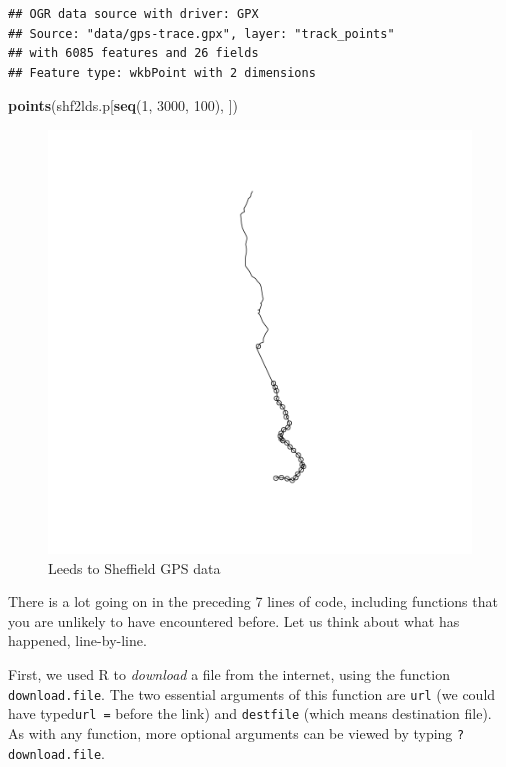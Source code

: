 \documentclass[]{article}
\makeatletter
\newenvironment{Shaded}{}{}
\newcommand{\KeywordTok}[1]{\textcolor[rgb]{0.00,0.44,0.13}{\textbf{{#1}}}}
\newcommand{\DecValTok}[1]{\textcolor[rgb]{0.25,0.63,0.44}{{#1}}}
\newcommand{\NormalTok}[1]{{#1}}
\def\maxwidth{\ifdim\Gin@nat@width>\linewidth\linewidth
\else\Gin@nat@width\fi}
\let\Oldincludegraphics\includegraphics
\renewcommand{\includegraphics}[1]{\Oldincludegraphics[width=\maxwidth]{#1}}
\makeatother
\begin{document}
\begin{verbatim}
## OGR data source with driver: GPX 
## Source: "data/gps-trace.gpx", layer: "track_points"
## with 6085 features and 26 fields
## Feature type: wkbPoint with 2 dimensions
\end{verbatim}
\begin{Shaded}
\begin{Highlighting}[]
\KeywordTok{points}\NormalTok{(shf2lds.p[}\KeywordTok{seq}\NormalTok{(}\DecValTok{1}\NormalTok{, }\DecValTok{3000}\NormalTok{, }\DecValTok{100}\NormalTok{), ])}
\end{Highlighting}
\end{Shaded}
\begin{figure}[htbp]
\centering
\includegraphics{figure/Leeds_to_Sheffield_GPS_data.png}
\caption{Leeds to Sheffield GPS data}
\end{figure}

There is a lot going on in the preceding 7 lines of code, including
functions that you are unlikely to have encountered before. Let us think
about what has happened, line-by-line.

First, we used R to \emph{download} a file from the internet, using the
function \texttt{download.file}. The two essential arguments of this
function are \texttt{url} (we could have typed\texttt{url =} before the
link) and \texttt{destfile} (which means destination file). As with any
function, more optional arguments can be viewed by typing
\texttt{?download.file}.
\end{document}
